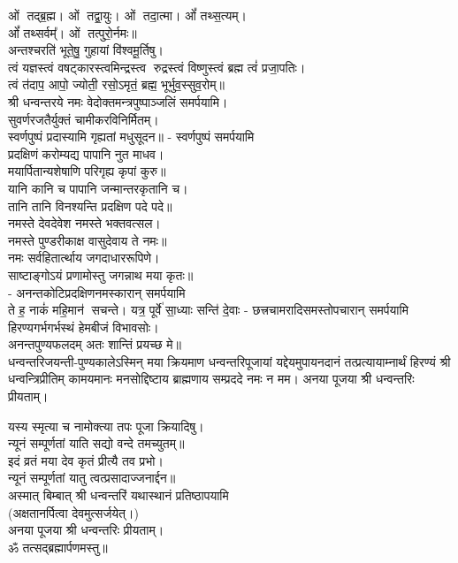 \begin{center}
ओं तद्ब्र॒ह्म। ओं तद्वा॒युः। ओं तदा॒त्मा। ओं᳚ तथ्स॒त्यम्‌।\\
ओं᳚ तथ्सर्वम्᳚‌। ओं तत्पुरो॒र्नमः॥\\

अन्तश्चरति॑ भूते॒षु॒ गुहायां वि॑श्वमू॒र्तिषु। \\
त्वं यज्ञस्त्वं वषट्कारस्त्वमिन्द्रस्त्व रुद्रस्त्वं विष्णुस्त्वं ब्रह्म त्वं॑ प्रजा॒पतिः। \\
त्वं त॑दाप॒ आपो॒ ज्योती॒ रसो॒ऽमृतं॒ ब्रह्म॒ भूर्भुव॒स्सुव॒रोम्‌॥\\

श्री धन्वन्तरये नमः वेदोक्तमन्त्रपुष्पाञ्जलिं समर्पयामि।\\

सुवर्णरजतैर्युक्तं चामीकरविनिर्मितम्।\\
स्वर्णपुष्पं प्रदास्यामि गृह्यतां मधुसूदन॥ - स्वर्णपुष्पं समर्पयामि\\
 
प्रदक्षिणं करोम्यद्य पापानि नुत माधव।\\
मयार्पितान्यशेषाणि परिगृह्य कृपां कुरु॥\\
 यानि कानि च पापानि जन्मान्तरकृतानि च।\\
तानि तानि विनश्यन्ति प्रदक्षिण पदे पदे॥\\
 
नमस्ते देवदेवेश नमस्ते भक्तवत्सल।\\
नमस्ते पुण्डरीकाक्ष वासुदेवाय ते नमः॥\\
नमः सर्वहितार्त्थाय जगदाधाररूपिणे।\\
साष्टाङ्गोऽयं प्रणामोस्तु जगन्नाथ मया कृतः॥\\
- अनन्तकोटिप्रदक्षिणनमस्कारान् समर्पयामि\\

{ते ह॒ नाकं॑ महि॒मान॑ सचन्ते। यत्र॒ पूर्वे॑ सा॒ध्याः सन्ति॑ दे॒वाः}
- छत्त्रचामरादिसमस्तोपचारान् समर्पयामि\\

हिरण्यगर्भगर्भस्थं हेमबीजं विभावसोः।\\
अनन्तपुण्यफलदम् अतः शान्तिं प्रयच्छ मे॥\\

धन्वन्तरिजयन्ती-पुण्यकालेऽस्मिन् मया क्रियमाण धन्वन्तरिपूजायां यद्देयमुपायनदानं तत्प्रत्यायाम्नार्थं
हिरण्यं श्री धन्वन्त्रिप्रीतिम् 
कामयमानः मनसोद्दिष्टाय ब्राह्मणाय सम्प्रददे नमः न मम। 
अनया पूजया श्री धन्वन्तरिः प्रीयताम्। 
 
 यस्य स्मृत्या च नामोक्त्या तपः पूजा क्रियादिषु।\\
न्यूनं सम्पूर्णतां याति सद्यो वन्दे तमच्युतम्॥ \\
इदं व्रतं मया देव कृतं प्रीत्यै तव प्रभो।\\
न्यूनं सम्पूर्णतां यातु त्वत्प्रसादाज्जनार्द्दन॥\\
 
अस्मात् बिम्बात् श्री धन्वन्तरिं यथास्थानं प्रतिष्ठापयामि\\
(अक्षतानर्पित्वा देवमुत्सर्जयेत्।)\\
अनया पूजया श्री धन्वन्तरिः प्रीयताम्। \\



ॐ तत्सद्ब्रह्मार्पणमस्तु॥

\end{center}